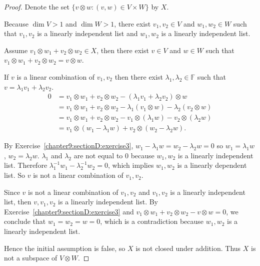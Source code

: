 \begin{proof}
    Denote the set $\{ v\otimes w: (v, w)\in V\times W \}$ by $X$.

    Because $\dim V > 1$ and $\dim W > 1$, there exist $v_{1}, v_{2}\in V$ and $w_{1}, w_{2}\in W$ such that $v_{1}, v_{2}$ is a linearly independent list and $w_{1}, w_{2}$ is a linearly independent list.

    Assume $v_{1}\otimes w_{1} + v_{2}\otimes w_{2}\in X$, then there exist $v\in V$ and $w\in W$ such that $v_{1}\otimes w_{1} + v_{2}\otimes w_{2} = v\otimes w$.

    If $v$ is a linear combination of $v_{1}, v_{2}$ then there exist $\lambda_{1}, \lambda_{2}\in\mathbb{F}$ such that $v = \lambda_{1}v_{1} + \lambda_{2}v_{2}$.
    \begin{align*}
        0 & = v_{1}\otimes w_{1} + v_{2}\otimes w_{2} - (\lambda_{1}v_{1} + \lambda_{2}v_{2})\otimes w            \\
          & = v_{1}\otimes w_{1} + v_{2}\otimes w_{2} - \lambda_{1}(v_{1}\otimes w) - \lambda_{2}(v_{2}\otimes w) \\
          & = v_{1}\otimes w_{1} + v_{2}\otimes w_{2} - v_{1}\otimes (\lambda_{1}w) - v_{2}\otimes (\lambda_{2}w) \\
          & = v_{1}\otimes (w_{1} - \lambda_{1}w) + v_{2}\otimes (w_{2} - \lambda_{2}w).
    \end{align*}

    By Exercise~\ref{chapter9:sectionD:exercise3}, $w_{1} - \lambda_{1}w = w_{2} - \lambda_{2}w = 0$ so $w_{1} = \lambda_{1}w$, $w_{2} = \lambda_{2}w$. $\lambda_{1}$ and $\lambda_{2}$ are not equal to $0$ because $w_{1}, w_{2}$ is a linearly independent list. Therefore $\lambda_{1}^{-1}w_{1} - \lambda_{2}^{-1}w_{2} = 0$, which implies $w_{1}, w_{2}$ is a linearly dependent list. So $v$ is not a linear combination of $v_{1}, v_{2}$.

    Since $v$ is not a linear combination of $v_{1}, v_{2}$ and $v_{1}, v_{2}$ is a linearly independent list, then $v, v_{1}, v_{2}$ is a linearly independent list. By Exercise~\ref{chapter9:sectionD:exercise3} and $v_{1}\otimes w_{1} + v_{2}\otimes w_{2} - v\otimes w = 0$, we conclude that $w_{1} = w_{2} = w = 0$, which is a contradiction because $w_{1}, w_{2}$ is a linearly independent list.

    Hence the initial assumption is false, so $X$ is not closed under addition. Thus $X$ is not a subspace of $V\otimes W$.
\end{proof}
\newpage

